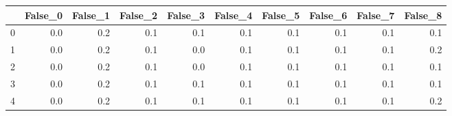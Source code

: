 \begin{tabular}{lrrrrrrrrr}
\toprule
{} &  False\_0 &  False\_1 &  False\_2 &  False\_3 &  False\_4 &  False\_5 &  False\_6 &  False\_7 &  False\_8 \\ \hline
\midrule
0 &      0.0 &      0.2 &      0.1 &      0.1 &      0.1 &      0.1 &      0.1 &      0.1 &      0.1 \\ \hline
1 &      0.0 &      0.2 &      0.1 &      0.0 &      0.1 &      0.1 &      0.1 &      0.1 &      0.2 \\ \hline
2 &      0.0 &      0.2 &      0.1 &      0.0 &      0.1 &      0.1 &      0.1 &      0.1 &      0.1 \\ \hline
3 &      0.0 &      0.2 &      0.1 &      0.1 &      0.1 &      0.1 &      0.1 &      0.1 &      0.1 \\ \hline
4 &      0.0 &      0.2 &      0.1 &      0.1 &      0.1 &      0.1 &      0.1 &      0.1 &      0.2 \\ \hline
\bottomrule
\end{tabular}
